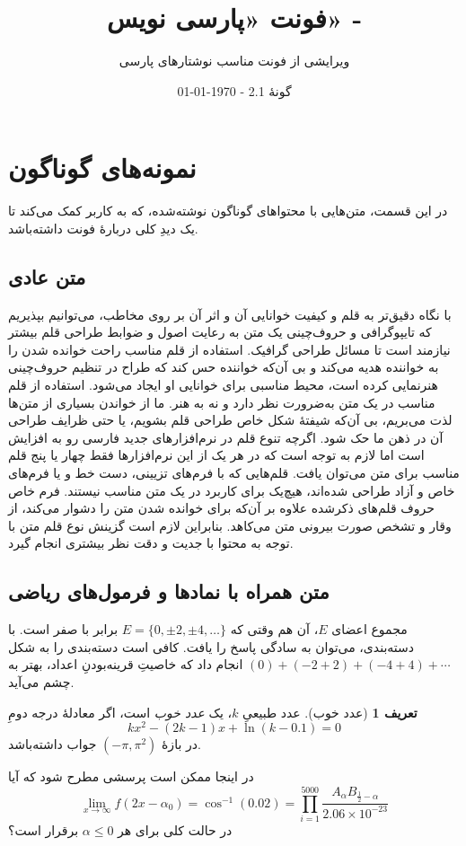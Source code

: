 \documentclass[10pt,a5paper]{article}
\title{\textbf{فونت «پارسی نویس» - \lr{``Parsi Nevis''}}}
\author{ویرایشی از فونت \lr{Scheherazade New} مناسب نوشتارهای پارسی}
\date{%
گونۀ 2.1
\quad - \quad \today \\
\lr{Version 1.2 \quad - \quad \latintoday}
}
\theoremstyle{definition}
\newtheorem{definition}{تعریف}[section]
\theoremstyle{plain}
\begin{document}
\maketitle

\section{نمونه‌های گوناگون}
در این قسمت، متن‌هایی با محتواهای گوناگون نوشته‌شده، که به کاربر کمک می‌کند تا یک دیدِ کلی دربارۀ فونت داشته‌باشد.

\subsection{متن عادی}
با نگاه دقیق‌تر به قلم و کیفیت خوانایی آن و اثر آن بر روی مخاطب، می‌توانیم بپذیریم که تایپوگرافی و حروف‌چینی یک متن به رعایت اصول و ضوابط طراحی قلم بیشتر نیازمند است تا مسائل طراحی گرافیک. استفاده از قلم مناسب راحت خوانده شدن را به خواننده هدیه می‌کند و بی آن‌که خواننده حس کند که طراح در تنظیم حروف‌چینی هنرنمایی کرده است، محیط مناسبی برای خوانایی او ایجاد می‌شود. استفاده از قلم مناسب در یک متن به‌ضرورت نظر دارد و نه به هنر. ما از خواندن بسیاری از متن‌ها لذت می‌بریم، بی آن‌که شیفتهٔ شکل خاص طراحی قلم بشویم، یا حتی ظرایف طراحی آن در ذهن ما حک شود. اگرچه تنوع قلم در نرم‌افزارهای جدید فارسی رو به افزایش است اما لازم به توجه است که در هر یک از این نرم‌افزارها فقط چهار یا پنج قلم مناسب برای متن می‌توان یافت. قلم‌هایی که با فرم‌های تزیینی، دست خط و یا فرم‌های خاص و آزاد طراحی شده‌اند، هیچ‌یک برای کاربرد در یک متن مناسب نیستند. فرم خاص حروف قلم‌های ذکرشده علاوه بر آن‌که برای خوانده شدن متن را دشوار می‌کند، از وقار و تشخص صورت بیرونی متن می‌کاهد. بنابراین لازم است گزینش نوع قلم متن با توجه به محتوا با جدیت و دقت نظر بیشتری انجام گیرد.

\subsection{متن همراه با نمادها و فرمول‌های ریاضی}
مجموع اعضای $E$، آن هم وقتی که $E=\{0,\pm2,\pm4,\ldots\}$ برابر با صفر است. با دسته‌بندی، می‌توان به سادگی پاسخ را یافت. کافی است دسته‌بندی را به شکل $(0)+(-2+2)+(-4+4)+\cdots$ انجام داد که خاصیتِ قرینه‌بودنِ اعداد، بهتر به چشم می‌آید.
\begin{definition}[عدد خوب]
عدد طبیعیِ $k$، یک \emph{عدد خوب }است، اگر معادلۀ درجه دومِ
\[kx^2-(2k-1)x+\ln(k-0.1)=0\]
در بازۀ $(-\pi,\pi^2)$ جواب داشته‌باشد.
\end{definition}
در اینجا ممکن است پرسشی مطرح شود که آیا
\[\lim_{x\to\infty} f(2x-\alpha_0)=\cos^{-1}(0.02)
=\prod_{i=1}^{5000} \frac{A_\alpha B_{\frac{1}{2}-\alpha}}{2.06\times10^{-23}}
\]
در حالت کلی برای هر $\alpha\leq0$ برقرار است؟
\end{document}
